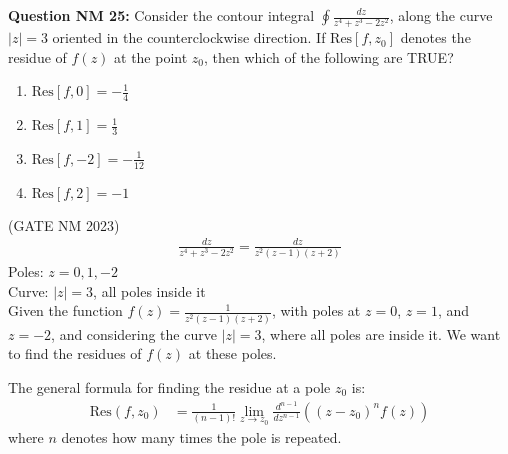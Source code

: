 \documentclass[journal,12pt,twocolumn]{IEEEtran}
\theoremstyle{remark}
\begin{document}
\title{}
\author{Sasa Mardi, EE23BTECH11222}
\date{}
\maketitle

\textbf{Question NM 25:} Consider the contour integral $\oint \frac{dz}{z^4 + z^3 - 2z^2}$, along the curve $|z| = 3$ oriented in the counterclockwise direction. If $\text{Res}[f, z_0]$ denotes the residue of $f(z)$ at the point $z_0$, then which of the following are TRUE? \\
\begin{enumerate}
    \item $\text{Res}[f, 0] = -\frac{1}{4}$
    \item $\text{Res}[f, 1] = \frac{1}{3}$
    \item $\text{Res}[f, -2] = -\frac{1}{12}$
    \item $\text{Res}[f, 2] = -1$
\end{enumerate}
\hfill{(GATE NM 2023)}\\
\solution
\fi
\begin{align}
\frac{dz}{z^4 + z^3 - 2z^2} = \frac{dz}{z^2(z-1)(z+2)}
\end{align}
Poles: $z = 0, 1, -2$ \\
Curve: $|z| = 3$, all poles inside it \\
Given the function $f(z) = \frac{1}{z^2(z-1)(z+2)}$, with poles at $z = 0$, $z = 1$, and $z = -2$, and considering the curve $|z| = 3$, where all poles are inside it. We want to find the residues of $f(z)$ at these poles.

The general formula for finding the residue at a pole $z_0$ is:
\begin{align}
\text{Res}(f, z_0) &= \frac{1}{(n-1)!} \lim_{z \to z_0} \frac{d^{n-1}}{dz^{n-1}} \left( (z - z_0)^n f(z) \right)
\end{align}
where $n$ denotes how many times the pole is repeated.
\end{document}
